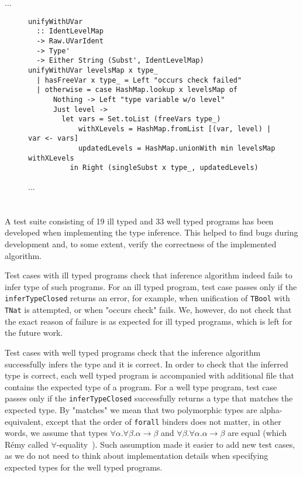 ...

\begin{figure}[H]
  \begin{verbatim}
unifyWithUVar
  :: IdentLevelMap
  -> Raw.UVarIdent
  -> Type'
  -> Either String (Subst', IdentLevelMap)
unifyWithUVar levelsMap x type_
  | hasFreeVar x type_ = Left "occurs check failed"
  | otherwise = case HashMap.lookup x levelsMap of
      Nothing -> Left "type variable w/o level"
      Just level ->
        let vars = Set.toList (freeVars type_)
            withXLevels = HashMap.fromList [(var, level) | var <- vars]
            updatedLevels = HashMap.unionWith min levelsMap withXLevels
          in Right (singleSubst x type_, updatedLevels)
  \end{verbatim}
  \caption{...}
\end{figure}

\section{}

A test suite consisting of 19 ill typed and 33 well typed programs has been developed when implementing the type inference. This helped to find bugs during development and, to some extent, verify the correctness of the implemented algorithm.

Test cases with ill typed programs check that inference algorithm indeed fails to infer type of such programs. For an ill typed program, test case passes only if the \texttt{inferTypeClosed} returns an error, for example, when unification of \texttt{TBool} with \texttt{TNat} is attempted, or when "occurs check" fails. We, however, do not check that the exact reason of failure is as expected for ill typed programs, which is left for the future work.

Test cases with well typed programs check that the inference algorithm successfully infers the type and it is correct. In order to check that the inferred type is correct, each well typed program is accompanied with additional file that contains the expected type of a program. For a well type program, test case passes only if the \texttt{inferTypeClosed} successfully returns a type that matches the expected type. By "matches" we mean that two polymorphic types are alpha-equivalent, except that the order of \texttt{forall} binders does not matter, in other words, we assume that types $\forall \alpha. \forall \beta. \alpha \to \beta$ and $\forall \beta. \forall \alpha. \alpha \to \beta$ are equal (which R\'emy called $\forall$-equality~\cite{Remy1992_SortedEqTheoryTypes}). Such assumption made it easier to add new test cases, as we do not need to think about implementation details when specifying expected types for the well typed programs.

